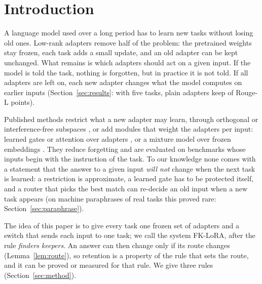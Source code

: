 \section{Introduction}
\label{sec:intro}

A language model used over a long period has to learn new tasks without losing old ones. Low-rank
adapters \citep{hu2022lora} remove half of the problem: the pretrained weights stay frozen, each task
adds a small update, and an old adapter can be kept unchanged. What remains is which adapters should
act on a given input. If the model is told the task, nothing is forgotten, but in practice it is not
told. If all adapters are left on, each new adapter changes what the model computes on earlier inputs
(Section~\ref{sec:results}: with five tasks, plain adapters keep \FivePlainAP{} of
\FivePlainLearned{} Rouge-L points).

Published methods restrict what a new adapter may learn, through orthogonal or interference-free
subspaces \citep{wang2023olora,liang2024inflora,spacelora2026}, or add modules that weight the
adapters per input: learned gates or attention over adapters
\citep{liang2025gainlora,zhao2024sapt}, or a mixture model over frozen embeddings
\citep{latentlora2026}. They reduce forgetting and are evaluated on benchmarks whose inputs begin with
the instruction of the task. To our knowledge none comes with a statement that the answer to a given
input \emph{will not} change when the next task is learned: a restriction is approximate, a learned
gate has to be protected itself, and a router that picks the best match can re-decide an old input
when a new task appears (on machine paraphrases of real tasks this proved rare: Section~\ref{sec:paraphrase}).

The idea of this paper is to give every task one frozen set of adapters and a switch that sends each
input to one task; we call the system FK-LoRA, after the rule \emph{finders keepers}. An answer can
then change only if its route changes (Lemma~\ref{lem:route}), so retention is a property of the rule
that sets the route, and it can be proved or measured for that rule. We give three rules
(Section~\ref{sec:method}).

